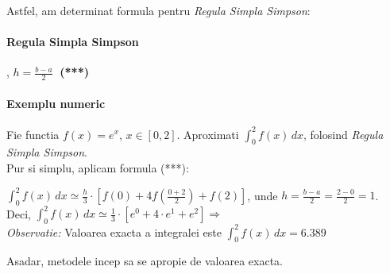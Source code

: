 \documentclass{article}
\newenvironment{mdframe16cm}{%
    \begin{mdframed}[nobreak,userdefinedwidth=16cm]
}{%
    \end{mdframed}%
}%
\begin{document}
Astfel, am determinat formula pentru \textit{Regula Simpla Simpson}:
\begin{mdframe16cm}
    \vspace{-0.5cm}\paragraph{Regula Simpla Simpson}
    \tabto{0.5cm}, $h = \frac{b-a}{2}\;$ \textbf{(***)}
\end{mdframe16cm}


\paragraph{Exemplu numeric}

\tabto{0.5cm}\begin{minipage}{0.7\textwidth}
    \vspace{0.5cm}\tabto{0.5cm} Fie functia $f(x) = e^x$, $x \in [0, 2]$. Aproximati $\int_0^2 f(x)\, dx$, folosind \textit{Regula Simpla Simpson}. \\
    
    \tabto{0.5cm} Pur si simplu, aplicam formula (***):
    
    \hspace{0.45cm}$\int_0^2 f(x)\, dx \simeq \frac{h}{3} \cdot [f(0) + 4f(\frac{0+2}{2}) + f(2)]$, unde $h = \frac{b-a}{2} = \frac{2-0}{2} = 1$. \\
    
    \tabto{0.5cm} Deci, $\int_0^2 f(x)\, dx \simeq \frac{1}{3} \cdot [e^0 + 4 \cdot e^1 + e^2] \Longrightarrow$  \\
    
    \tabto{0.5cm} \textit{Observatie:} Valoarea exacta a integralei este $\int_0^2 f(x)\, dx = 6.389$
    
    \tabto{0.5cm} Asadar, metodele incep sa se apropie de valoarea exacta.
\end{minipage}\hspace{0.5cm}
\end{document}
